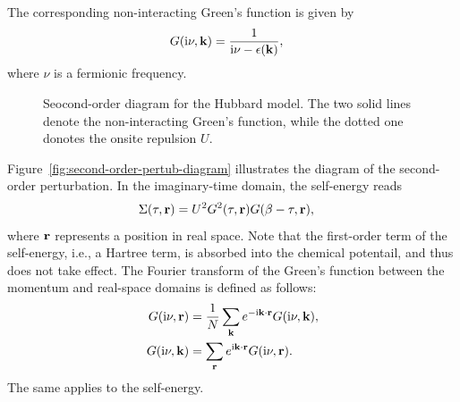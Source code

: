 \documentclass[submission, LectureNotes]{SciPost}
\newcommand{\bk}{\ensuremath{{\bf k}}}
\newcommand{\br}{\ensuremath{{\bf r}}}
\newcommand\ii{\mathrm{i}}%
\newcommand\iv{\ii\nu}%
\begin{document}
%
%
The corresponding non-interacting Green's function is given by
\begin{align}
    G(\iv, \bk) &= \frac{1}{\iv - \epsilon(\bk)},\label{eq:Gk}
\end{align}
where $\nu$ is a fermionic frequency.

\begin{figure}
    \centering
    \caption{Seocond-order diagram for the Hubbard model.
    The two solid lines denote the non-interacting Green's function,
    while the dotted one donotes the onsite repulsion $U$.
    }
    \label{fig:second-order-diagram}
\end{figure}

Figure~\ref{fig:second-order-pertub-diagram} illustrates the diagram of the second-order perturbation.
In the imaginary-time domain, the self-energy reads
\begin{align}
    \Sigma(\tau, \br) &= U^2 G^2(\tau, \br) G(\beta-\tau, \br),\label{eq:sigma_r}
\end{align}
where $\br$ represents a position in real space.
Note that the first-order term of the self-energy, i.e., a Hartree term, is absorbed into the chemical potentail,
and thus does not take effect.
The Fourier transform of the Green's function between the momentum and real-space domains is defined as follows:
\begin{align}
    G(\iv, \br) &= \frac{1}{N} \sum_{\bk} e^{-\ii \bk \cdot \br} G(\iv, \bk),\label{eq:ft-to-gr}\\
    G(\iv, \bk) &= \sum_{\br} e^{\ii \bk \cdot \br} G(\iv, \br).\label{eq:ft-to-gk}
\end{align}
The same applies to the self-energy.
\end{document}
